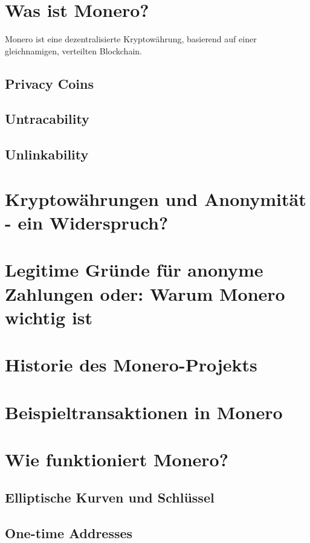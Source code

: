 \chapter{Was ist Monero?}
Monero ist eine dezentralisierte Kryptowährung, basierend auf einer gleichnamigen, verteilten Blockchain.\cite{Koe2020}

\section{Privacy Coins}

\section{Untracability}

\section{Unlinkability}

\chapter{Kryptowährungen und Anonymität - ein Widerspruch?}

\chapter{Legitime Gründe für anonyme Zahlungen oder: Warum Monero wichtig ist}

\chapter{Historie des Monero-Projekts}

\chapter{Beispieltransaktionen in Monero}

\chapter{Wie funktioniert Monero?}

\section{Elliptische Kurven und Schlüssel}

\section{One-time Addresses}

